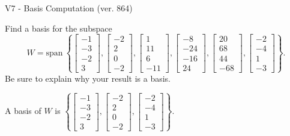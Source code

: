 \begin{exercise}
  \begin{exerciseTitle}V7 - Basis Computation (ver. 864)\end{exerciseTitle}
  \begin{exerciseStatement}
    Find a basis for the subspace 
\[W=\mathrm{span}\ \left\{\left[\begin{array}{r}
-1 \\
-3 \\
-2 \\
3
\end{array}\right] , \left[\begin{array}{r}
-2 \\
2 \\
0 \\
-2
\end{array}\right] , \left[\begin{array}{r}
1 \\
11 \\
6 \\
-11
\end{array}\right] , \left[\begin{array}{r}
-8 \\
-24 \\
-16 \\
24
\end{array}\right] , \left[\begin{array}{r}
20 \\
68 \\
44 \\
-68
\end{array}\right] , \left[\begin{array}{r}
-2 \\
-4 \\
1 \\
-3
\end{array}\right]\right\}.\]
 Be sure to explain why your result is a basis.


  \end{exerciseStatement}
  \begin{exerciseAnswer}
   A basis of \(W\) is  \(\left\{\left[\begin{array}{r}
-1 \\
-3 \\
-2 \\
3
\end{array}\right] , \left[\begin{array}{r}
-2 \\
2 \\
0 \\
-2
\end{array}\right] , \left[\begin{array}{r}
-2 \\
-4 \\
1 \\
-3
\end{array}\right]\right\}\).
  


  \end{exerciseAnswer}
\end{exercise}